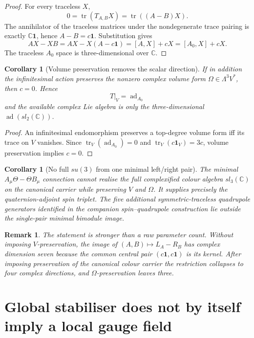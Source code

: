\documentclass[11pt,a4paper]{article}
\newtheorem{corollary}[theorem]{Corollary}
\newtheorem{remark}[theorem]{Remark}
\newcommand{\C}{\mathbb C}
\begin{document}
\begin{proof}
For every traceless $X$,
\[
 0=\operatorname{tr}(T_{A,B}X)
 =\operatorname{tr}((A-B)X).
\]
The annihilator of the traceless matrices under the nondegenerate trace
pairing is exactly $\C\mathbf1$, hence $A-B=c\mathbf1$.  Substitution gives
\[
 AX-XB=AX-X(A-c\mathbf1)=[A,X]+cX=[A_0,X]+cX.
\]
The traceless $A_0$ space is three-dimensional over $\C$.
\end{proof}

\begin{corollary}[Volume preservation removes the scalar direction]
\label{cor:volume}
If in addition the infinitesimal action preserves the nonzero complex volume
form $\Omega\in\Lambda^3V^*$, then $c=0$.  Hence
\[
 \boxed{T|_V=\operatorname{ad}_{A_0}}
\]
and the available complex Lie algebra is only the three-dimensional
$\operatorname{ad}(sl_2(\C))$.
\end{corollary}

\begin{proof}
An infinitesimal endomorphism preserves a top-degree volume form iff its trace
on $V$ vanishes.  Since
$\operatorname{tr}_V(\operatorname{ad}_{A_0})=0$ and
$\operatorname{tr}_V(c\mathbf1_V)=3c$, volume preservation implies $c=0$.
\end{proof}

\begin{corollary}[No full $su(3)$ from one minimal left/right pair]
The minimal $A_\mu\Theta-\Theta B_\mu$ connection cannot realise the full
complexified colour algebra $sl_3(\C)$ on the canonical carrier while
preserving $V$ and $\Omega$.  It supplies precisely the quaternion-adjoint
spin triplet.  The five additional symmetric-traceless quadrupole generators
identified in the companion spin--quadrupole construction lie outside the
single-pair minimal bimodule image.
\end{corollary}

\begin{remark}
The statement is stronger than a raw parameter count.  Without imposing
$V$-preservation, the image of $(A,B)\mapsto L_A-R_B$ has complex dimension
seven because the common central pair $(c\mathbf1,c\mathbf1)$ is its kernel.
After imposing preservation of the canonical colour carrier the restriction
collapses to four complex directions, and $\Omega$-preservation leaves three.
\end{remark}

\section{Global stabiliser does not by itself imply a local gauge field}
\end{document}

